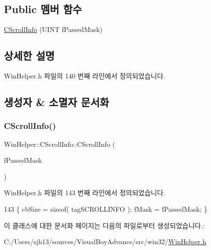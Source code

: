 \subsection*{Public 멤버 함수}
\begin{DoxyCompactItemize}
\item 
\mbox{\hyperlink{class_win_helper_1_1_c_scroll_info_afc8fca26c959c0c5d70dc19c71333a1e}{C\+Scroll\+Info}} (U\+I\+NT f\+Passed\+Mask)
\end{DoxyCompactItemize}


\subsection{상세한 설명}


Win\+Helper.\+h 파일의 140 번째 라인에서 정의되었습니다.



\subsection{생성자 \& 소멸자 문서화}
\mbox{\label{class_win_helper_1_1_c_scroll_info_afc8fca26c959c0c5d70dc19c71333a1e}} 
\subsubsection{\texorpdfstring{C\+Scroll\+Info()}{CScrollInfo()}}
{\footnotesize\ttfamily Win\+Helper\+::\+C\+Scroll\+Info\+::\+C\+Scroll\+Info (\begin{DoxyParamCaption}\item[{U\+I\+NT}]{f\+Passed\+Mask }\end{DoxyParamCaption})\hspace{0.3cm}{\ttfamily [inline]}}



Win\+Helper.\+h 파일의 143 번째 라인에서 정의되었습니다.


\begin{DoxyCode}
143 \{ cbSize = \textcolor{keyword}{sizeof}( tagSCROLLINFO ); fMask = fPassedMask; \}
\end{DoxyCode}


이 클래스에 대한 문서화 페이지는 다음의 파일로부터 생성되었습니다.\+:\begin{DoxyCompactItemize}
\item 
C\+:/\+Users/sjh13/sources/\+Visual\+Boy\+Advance/src/win32/\mbox{\hyperlink{_win_helper_8h}{Win\+Helper.\+h}}\end{DoxyCompactItemize}
